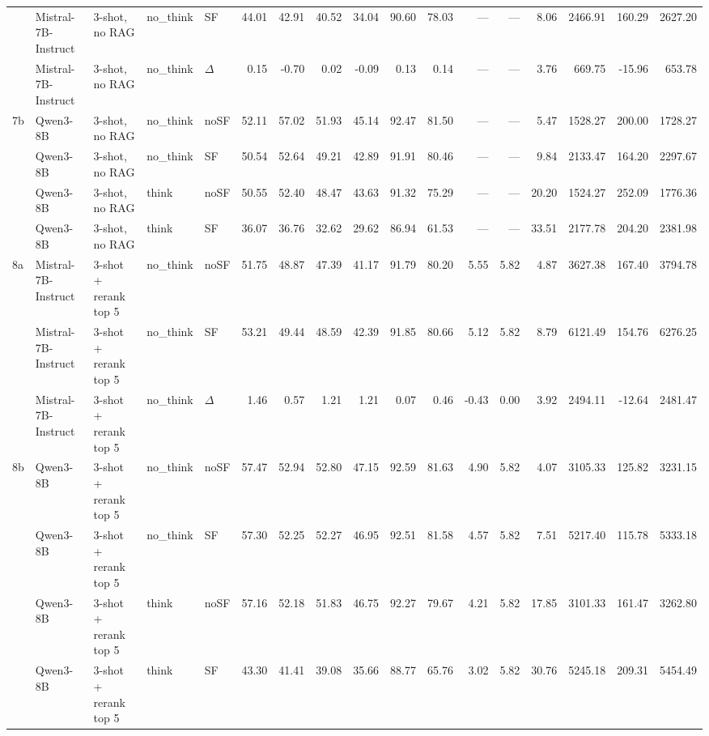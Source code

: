 \begin{landscape}
\begin{footnotesize}
\begin{longtable}{l l l l l r r r r r r r r r r r r}
 & Mistral-7B-Instruct & 3-shot, no RAG & no\_think & SF & 44.01 & 42.91 & 40.52 & 34.04 & 90.60 & 78.03 & --- & --- & 8.06 & 2466.91 & 160.29 & 2627.20 \\
 & Mistral-7B-Instruct & 3-shot, no RAG & no\_think & $\Delta$ & 0.15 & -0.70 & 0.02 & -0.09 & 0.13 & 0.14 & --- & --- & 3.76 & 669.75 & -15.96 & 653.78 \\
7b & Qwen3-8B & 3-shot, no RAG & no\_think & noSF & 52.11 & 57.02 & 51.93 & 45.14 & 92.47 & 81.50 & --- & --- & 5.47 & 1528.27 & 200.00 & 1728.27 \\
 & Qwen3-8B & 3-shot, no RAG & no\_think & SF & 50.54 & 52.64 & 49.21 & 42.89 & 91.91 & 80.46 & --- & --- & 9.84 & 2133.47 & 164.20 & 2297.67 \\
 & Qwen3-8B & 3-shot, no RAG & think & noSF & 50.55 & 52.40 & 48.47 & 43.63 & 91.32 & 75.29 & --- & --- & 20.20 & 1524.27 & 252.09 & 1776.36 \\
 & Qwen3-8B & 3-shot, no RAG & think & SF & 36.07 & 36.76 & 32.62 & 29.62 & 86.94 & 61.53 & --- & --- & 33.51 & 2177.78 & 204.20 & 2381.98 \\
\midrule
8a & Mistral-7B-Instruct & 3-shot + rerank top 5 & no\_think & noSF & 51.75 & 48.87 & 47.39 & 41.17 & 91.79 & 80.20 & 5.55 & 5.82 & 4.87 & 3627.38 & 167.40 & 3794.78 \\
\rowcolor{tabhighlight} & Mistral-7B-Instruct & 3-shot + rerank top 5 & no\_think & SF & 53.21 & 49.44 & 48.59 & 42.39 & 91.85 & 80.66 & 5.12 & 5.82 & 8.79 & 6121.49 & 154.76 & 6276.25 \\
 & Mistral-7B-Instruct & 3-shot + rerank top 5 & no\_think & $\Delta$ & 1.46 & 0.57 & 1.21 & 1.21 & 0.07 & 0.46 & -0.43 & 0.00 & 3.92 & 2494.11 & -12.64 & 2481.47 \\
\rowcolor{tabhighlight}\textrightarrow{} 8b & Qwen3-8B & 3-shot + rerank top 5 & no\_think & noSF & 57.47 & 52.94 & 52.80 & 47.15 & 92.59 & 81.63 & 4.90 & 5.82 & 4.07 & 3105.33 & 125.82 & 3231.15 \\
 & Qwen3-8B & 3-shot + rerank top 5 & no\_think & SF & 57.30 & 52.25 & 52.27 & 46.95 & 92.51 & 81.58 & 4.57 & 5.82 & 7.51 & 5217.40 & 115.78 & 5333.18 \\
 & Qwen3-8B & 3-shot + rerank top 5 & think & noSF & 57.16 & 52.18 & 51.83 & 46.75 & 92.27 & 79.67 & 4.21 & 5.82 & 17.85 & 3101.33 & 161.47 & 3262.80 \\
 & Qwen3-8B & 3-shot + rerank top 5 & think & SF & 43.30 & 41.41 & 39.08 & 35.66 & 88.77 & 65.76 & 3.02 & 5.82 & 30.76 & 5245.18 & 209.31 & 5454.49 \\

\end{longtable}
\end{footnotesize}
\end{landscape}
